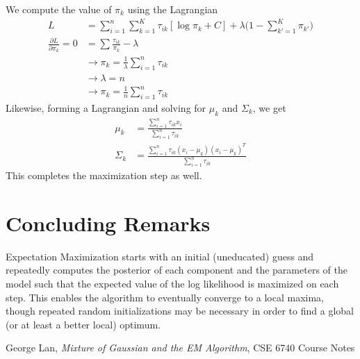 \documentclass{article}
\begin{document}
We compute the value of $\pi_{k}$ using the Lagrangian
\begin{align*}
	L
		&= \sum\limits_{i = 1}^{n} \sum\limits_{k = 1}^{K} \tau_{ik} [\log \pi_{k} + C] + \lambda \Bigg(1 - \sum\limits_{k' = 1}^{K} \pi_{k'}\Bigg) \\
	\frac{\partial L}{\partial \pi_{k}} = 0
		&=  \sum\limits \frac{\tau_{ik}}{\pi_{k}} - \lambda \\
		&\rightarrow \pi_{k} = \frac{1}{\lambda} \sum\limits_{i = 1}^{n} \tau_{ik} \\
		&\rightarrow \lambda = n \\
		&\rightarrow \pi_{k} = \frac{1}{n} \sum\limits_{i = 1}^{n} \tau_{ik}
\end{align*}
Likewise, forming a Lagrangian and solving for $\mu_{k}$ and $\Sigma_{k}$, we get
\begin{align*}
	\mu_{k} &= \frac{\sum\limits_{i = 1}^{n} \tau_{ik}x_{i}}{\sum\limits_{i = 1}^{n} \tau_{ik}} \\
	\Sigma_{k} &= \frac{\sum\limits_{i = 1}^{n} \tau_{ik}(x_{i} - \mu_{k})(x_{i} - \mu_{k})^{T}}{\sum\limits_{i = 1}^{n} \tau_{ik}}
\end{align*}
This completes the maximization step as well.

\section{Concluding Remarks}
Expectation Maximization starts with an initial (uneducated) guess and repeatedly computes the posterior of each component and the parameters of the model such that the expected value of the log likelihood is maximized on each step. This enables the algorithm to eventually converge to a local maxima, though repeated random initializations may be necessary in order to find a global (or at least a better local) optimum.

\newpage
\begin{thebibliography}{1}
	George Lan,
	\textit{Mixture of Gaussian and the EM Algorithm},
	CSE 6740 Course Notes
\end{thebibliography}
\end{document}
